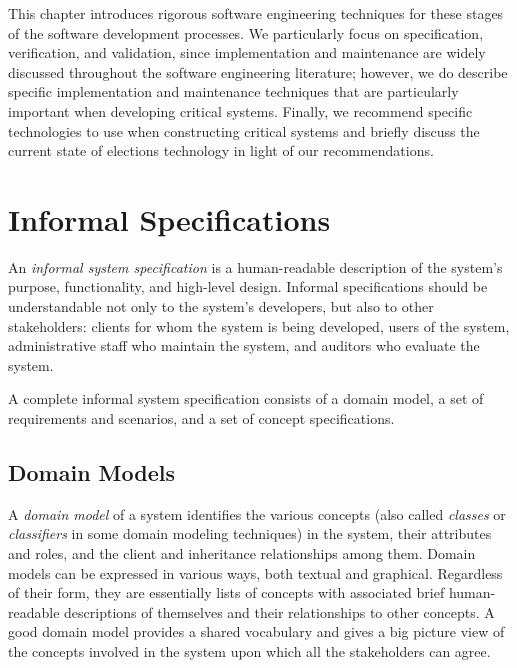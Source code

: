 This chapter introduces rigorous software engineering techniques for
these stages of the software development processes. We particularly
focus on specification, verification, and validation, since
implementation and maintenance are widely discussed throughout the
software engineering literature; however, we do describe specific
implementation and maintenance techniques that are particularly
important when developing critical systems. Finally, we recommend
specific technologies to use when constructing critical systems and
briefly discuss the current state of elections technology in light of
our recommendations.


\section{Informal Specifications}

An \emph{informal system specification} is a human-readable
description of the system's purpose, functionality, and high-level
design. Informal specifications should be understandable not only to
the system's developers, but also to other stakeholders: clients for
whom the system is being developed, users of the system,
administrative staff who maintain the system, and auditors who
evaluate the system.

A complete informal system specification consists of a domain model, a
set of requirements and scenarios, and a set of concept
specifications.

\subsection{Domain Models}

A \emph{domain model} of a system identifies the various concepts
(also called \emph{classes} or \emph{classifiers} in some domain
modeling techniques) in the system, their attributes and roles, and
the client and inheritance relationships among them. Domain models can
be expressed in various ways, both textual and graphical. Regardless
of their form, they are essentially lists of concepts with associated
brief human-readable descriptions of themselves and their
relationships to other concepts. A good domain model provides a shared
vocabulary and gives a big picture view of the concepts involved in
the system upon which all the stakeholders can agree.

